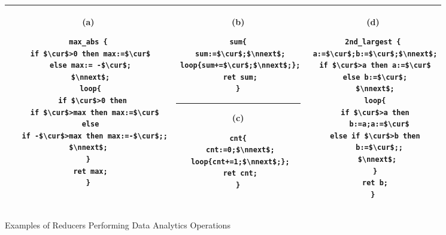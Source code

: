\begin{figure}
	\centering
	\lstset{language=C,
		basicstyle=\ttfamily\scriptsize}
	\begin{tabular}{|c|c|c|}
		\hline
		\begin{minipage}[t]{0.39\textwidth}
			(a)
			\begin{lstlisting}[mathescape=true]
max_abs {
 if $\cur$>0 then max:=$\cur$
 else max:= -$\cur$;
 $\nnext$;
 loop{
  if $\cur$>0 then
   if $\cur$>max then max:=$\cur$
  else 
   if -$\cur$>max then max:=-$\cur$;;
  $\nnext$;  
 } 
 ret max;
}
	\end{lstlisting}
		\end{minipage}&
		\begin{minipage}[t]{0.27\textwidth}
			(b)
			\begin{lstlisting}[mathescape=true]
sum{
 sum:=$\cur$;$\nnext$;
 loop{sum+=$\cur$;$\nnext$;};
 ret sum;
}
			\end{lstlisting}
\hrule\vspace{0.1cm}			
			(c)
			\begin{lstlisting}[mathescape=true]
cnt{
 cnt:=0;$\nnext$;
 loop{cnt+=1;$\nnext$;};
 ret cnt;
}
			\end{lstlisting}			
		\end{minipage}&
		\begin{minipage}[t]{0.30\textwidth}
			(d) 
			\begin{lstlisting}[mathescape=true]
2nd_largest {
 a:=$\cur$;b:=$\cur$;$\nnext$;
 if $\cur$>a then a:=$\cur$
 else b:=$\cur$;
 $\nnext$;
 loop{
  if $\cur$>a then 
   b:=a;a:=$\cur$
  else if $\cur$>b then 
   b:=$\cur$;;
  $\nnext$;
 }
 ret b;
}
			\end{lstlisting}		
		\end{minipage}\\
		\hline		
	\end{tabular}
	\caption{Examples of Reducers Performing Data Analytics Operations}
	\label{fig:examples}
\end{figure}